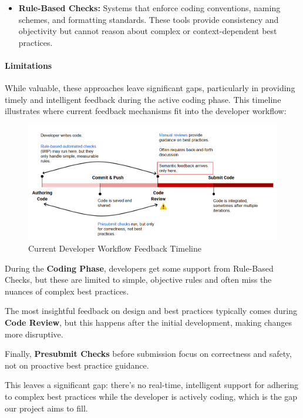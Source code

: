 \begin{spacing}{1.2}
\begin{itemize}
    \item \textbf{Rule-Based Checks:} Systems that enforce coding conventions, naming schemes, and formatting standards. These tools provide consistency and objectivity but cannot reason about complex or context-dependent best practices.
    
\end{itemize}

\paragraph{Limitations}
While valuable, these approaches leave significant gaps, particularly in providing timely and intelligent feedback during the active coding phase. This timeline illustrates where current feedback mechanisms fit into the developer workflow:

\begin{figure}[H]
    \centering
    \includegraphics[scale=0.9]{Images/developer_workflow_feedback_timeline.png}
    \caption{Current Developer Workflow Feedback Timeline}
    \label{fig:developer_workflow_feedback_timeline}
\end{figure}

During the \textbf{Coding Phase}, developers get some support from Rule-Based Checks, but these are limited to simple, objective rules and often miss the nuances of complex best practices. 

The most insightful feedback on design and best practices typically comes during \textbf{Code Review}, but this happens after the initial development, making changes more disruptive.

Finally, \textbf{Presubmit Checks} before submission focus on correctness and safety, not on proactive best practice guidance.

This leaves a significant gap: there's no real-time, intelligent support for adhering to complex best practices while the developer is actively coding, which is the gap our project aims to fill.


\end{spacing}
